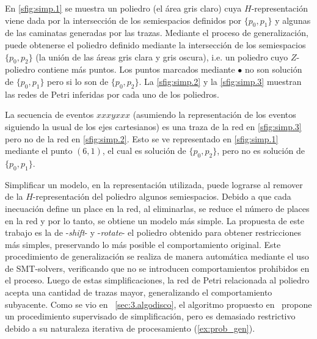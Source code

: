 \begin{example} 
    \label{ex:polyhedra}
    En \autoref{sfig:simp.1} se muestra un poliedro (el área gris claro) cuya $H$-representación viene
    dada por la intersección de los semiespacios definidos por $\{p_0,p_1\}$ y algunas de las caminatas generadas por las trazas.
    Mediante el proceso de generalización, puede obtenerse el poliedro definido 
    mediante la intersección de los semiespacios $\{p_0,p_2\}$ (la unión de las áreas gris clara y gris oscura), 
    i.e. un poliedro cuyo $Z$-poliedro contiene más puntos.
    Los puntos marcados mediante $\bullet$ no son solución de $\{p_0,p_1\}$ pero si lo son de $\{p_0,p_2\}$.
    La \autoref{sfig:simp.2} y la \autoref{sfig:simp.3} muestran las redes de Petri inferidas por cada uno 
    de los poliedros. 

    La secuencia de eventos $xxxyxxx$ (asumiendo la representación de los eventos siguiendo la usual de los 
    ejes cartesianos) es una traza de la red en \autoref{sfig:simp.3} pero no de la red en \autoref{sfig:simp.2}.
    Esto se ve representado en \autoref{sfig:simp.1} mediante el punto $(6,1)$, el cual es solución de $\{p_0,p_2\}$,
    pero no es solución de $\{p_0,p_1\}$.
\end{example}

Simplificar un modelo, en la representación utilizada, puede lograrse al remover 
de la $H$-representación del poliedro algunos semiespacios. Debido a que cada inecuación
define un place en la red, al eliminarlas, se reduce el número de places en la red y por lo tanto,
se obtiene un modelo más simple. 
La propuesta de este trabajo es la de  -\textit{shift}- y  
-\textit{rotate}- el poliedro obtenido para obtener restricciones más simples, 
preservando lo más posible el comportamiento original. Este procedimiento
de generalización se realiza de manera automática mediante el uso de SMT-solvers, 
verificando que no se introducen comportamientos prohibidos en el proceso.
Luego de estas simplificaciones, la red de Petri relacionada al poliedro acepta
una cantidad de trazas mayor, generalizando el comportamiento subyacente. 
Como se vio en ~\autoref{sec:3.algodisco}, el algoritmo propuesto en~\cite{LeonCB15}
propone un procedimiento supervisado de simplificación, pero es demasiado restrictivo
debido a su naturaleza iterativa de procesamiento (\autoref{ex:prob_gen}).

